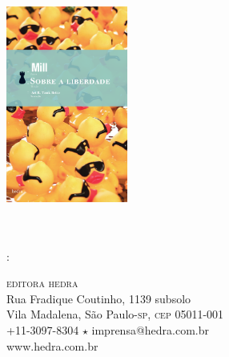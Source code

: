 \documentclass[a4paper,11pt]{article}
\newcommand{\titulo}[1]{\def\titulo{#1}}
\newcommand{\autor}[1]{\def\autor{#1}}
\newcommand{\isbn}[1]{\def\isbn{\textsc{isbn:} #1}}
\newcommand{\preco}[1]{\def\preco{R\$ #1,00}}
\newcommand{\pag}[1]{\def\pag{#1 páginas}}
\newcommand{\release}[1]{\def\release{#1}}
\begin{document}

\pagestyle{empty}

		\noindent\begin{minipage}[c]{4cm}
			\includegraphics[width=4cm]{capa.png}
		\end{minipage}
		\begin{minipage}[c]{7cm}
		{\Huge\textsc{\titulo}}\\
		{\Large\textit{\autor}\vspace{1mm}}\\
		\cat: \org\\
		\isbn\\
		\preco\\
		\pag\\
		\end{minipage}

\vspace{-5mm}
\noindent\dotfill

\noindent\textsc{editora hedra}\\
Rua Fradique Coutinho, 1139 subsolo\\
Vila Madalena, São Paulo-\textsc{sp}, \textsc{cep} 05011-001\\
+11-3097-8304 $\star$ imprensa@hedra.com.br\\
www.hedra.com.br\\
\end{document}
